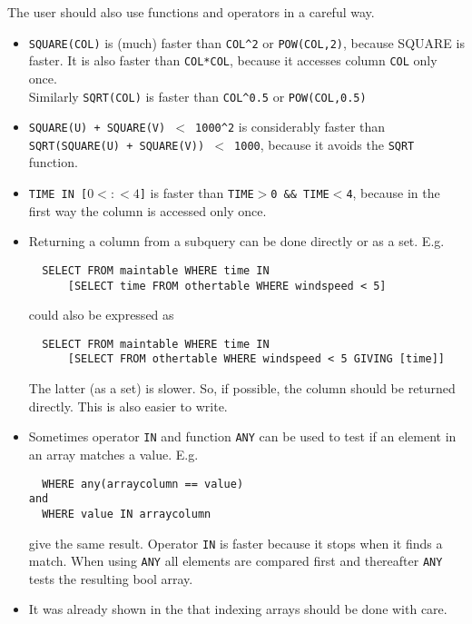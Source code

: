 The user should also use functions and operators in a careful way.
\begin{itemize}

\item
\texttt{SQUARE(COL)} is (much) faster than \texttt{COL}\verb+^+\texttt{2}
or \texttt{POW(COL,2)}, because SQUARE is faster.
It is also faster than \texttt{COL*COL}, because it accesses column
\texttt{COL} only once.
\\Similarly \texttt{SQRT(COL)} is faster than \texttt{COL}\verb+^+\texttt{0.5}
or \texttt{POW(COL,0.5)}

\item
\texttt{SQUARE(U) + SQUARE(V) $<$ 1000}\verb+^+\texttt{2} is considerably faster
than
\\\texttt{SQRT(SQUARE(U) + SQUARE(V)) $<$ 1000}, because it avoids the
\texttt{SQRT} function.

\item
\texttt{TIME IN [$0<:<4$]} is faster than
\texttt{TIME$>$0 \&\& TIME$<$4}, because in the first way the column is
accessed only once.

\item
Returning a column from a subquery can be done directly or as a
set. E.g.
\begin{verbatim}
  SELECT FROM maintable WHERE time IN
      [SELECT time FROM othertable WHERE windspeed < 5]
\end{verbatim}
could also be expressed as
\begin{verbatim}
  SELECT FROM maintable WHERE time IN
      [SELECT FROM othertable WHERE windspeed < 5 GIVING [time]]
\end{verbatim}
The latter (as a set) is slower. So, if possible, the column should
be returned directly. This is also easier to write.

\item
Sometimes operator \texttt{IN} and function \texttt{ANY} can be used to test
if an element in an array matches a value. E.g.
\begin{verbatim}
  WHERE any(arraycolumn == value)
and
  WHERE value IN arraycolumn
\end{verbatim}
give the same result.
Operator \texttt{IN} is faster because it stops when it finds a
match. When using \texttt{ANY} all elements are compared first and thereafter
\texttt{ANY} tests the resulting bool array.

\item
It was already shown in the 
that indexing arrays should be done with care.
\end{itemize}


